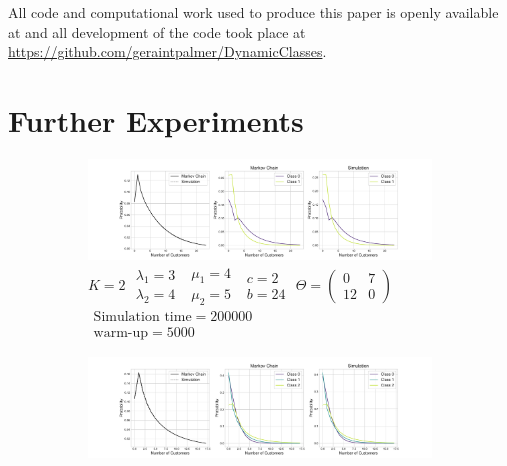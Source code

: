 \documentclass{article}
\begin{document}
All code and computational work used to produce this paper is openly available
at  \cite{palmeretal24} and all development of the code took place at
\url{https://github.com/geraintpalmer/DynamicClasses}.





\newpage
\appendix

\section{Further Experiments}\label{apx:more_priority_classes}

\begin{figure}[h!]
  \begin{center}
  \begin{subfigure}[b]{\textwidth}
    \includegraphics[width=\textwidth]{img/appendix_2class.pdf}
    \caption{
        $K = 2$
        $\begin{array}{c}\lambda_1 = 3\\\lambda_2 = 4\end{array}$
        $\begin{array}{c}\mu_1 = 4\\\mu_2 = 5\end{array}$
        $\begin{array}{c}c=2\\b=24\end{array}$
        $\Theta = \begin{pmatrix}0 & 7\\12 & 0\end{pmatrix}$
        $\begin{array}{c}\text{Simulation time} = 200000\\\text{warm-up} = 5000\end{array}$
    }
  \end{subfigure}
  \vspace{3mm}
  \begin{subfigure}[b]{\textwidth}
    \includegraphics[width=\textwidth]{img/appendix_3class.pdf}

\end{subfigure}
\end{center}
\end{figure}
\end{document}
